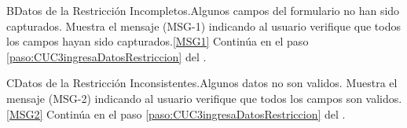 	\begin{UCtrayectoriaA}{B}{Datos de la Restricción Incompletos.}{Algunos campos del formulario no han sido capturados.}
			\UCpaso Muestra el mensaje (MSG-1) indicando al usuario verifique que todos los campos hayan sido capturados.\ref{MSG1}
			\UCpaso Continúa en el paso \ref{paso:CUC3ingresaDatosRestriccion} del .
	\end{UCtrayectoriaA}

	\begin{UCtrayectoriaA}{C}{Datos de la Restricción Inconsistentes.}{Algunos datos  no son validos.}
			\UCpaso Muestra el mensaje (MSG-2) indicando al usuario verifique que todos los campos son validos.\ref{MSG2}
			\UCpaso Continúa en el paso \ref{paso:CUC3ingresaDatosRestriccion} del .
	\end{UCtrayectoriaA}